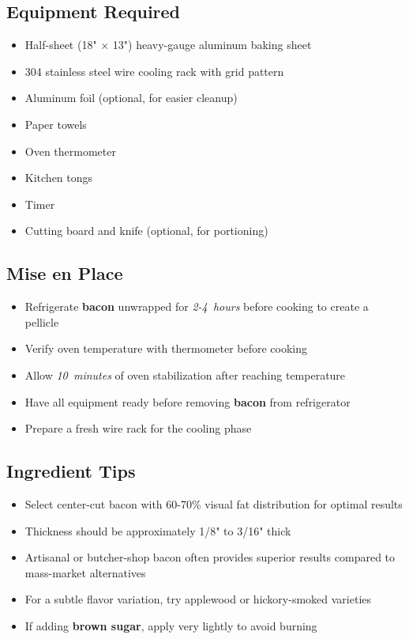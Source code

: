 \documentclass[11pt,letterpaper]{article}
\begin{document}
{\small
\setlength{\columnsep}{20pt}
\setlength{\multicolsep}{6pt}
\begin{multicols}{2}
\setlength{\parindent}{0pt}
\setlength{\parskip}{4pt}

\subsection*{Equipment Required}
\begin{itemize}
    \item Half-sheet (18" × 13") heavy-gauge aluminum baking sheet
    \item 304 stainless steel wire cooling rack with grid pattern
    \item Aluminum foil (optional, for easier cleanup)
    \item Paper towels
    \item Oven thermometer
    \item Kitchen tongs
    \item Timer
    \item Cutting board and knife (optional, for portioning)
\end{itemize}

\subsection*{Mise en Place}
\begin{itemize}
    \item Refrigerate \textbf{bacon} unwrapped for \textit{2-4~hours} before cooking to create a pellicle
    \item Verify oven temperature with thermometer before cooking
    \item Allow \textit{10~minutes} of oven stabilization after reaching temperature
    \item Have all equipment ready before removing \textbf{bacon} from refrigerator
    \item Prepare a fresh wire rack for the cooling phase
\end{itemize}

\subsection*{Ingredient Tips}
\begin{itemize}
    \item Select center-cut bacon with 60-70\% visual fat distribution for optimal results
    \item Thickness should be approximately 1/8" to 3/16" thick
    \item Artisanal or butcher-shop bacon often provides superior results compared to mass-market alternatives
    \item For a subtle flavor variation, try applewood or hickory-smoked varieties
    \item If adding \textbf{brown sugar}, apply very lightly to avoid burning
\end{itemize}


\end{multicols}}
\end{document}
